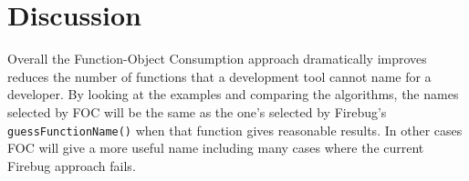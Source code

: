 \documentclass[10pt, preprint]{sigplanconf}
\begin{document}


   

\section{Discussion}
Overall the Function-Object Consumption approach dramatically improves reduces the number of functions that a development tool cannot name for a developer.  By looking at the examples and comparing the algorithms, the names selected by FOC will be the same as the one's selected by  Firebug's {\small \texttt{guessFunctionName()}} when that function gives reasonable results. In other cases FOC will give a more useful name including many cases where the current Firebug approach fails. 
\end{document}
